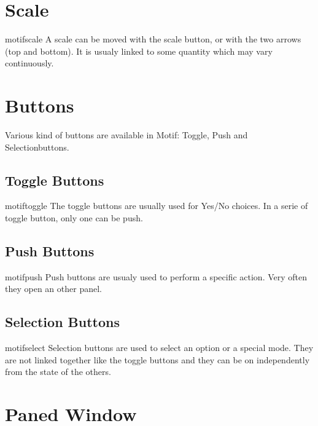 \section{Scale}


\begin{PAWf}[.05]{motifscale}
A scale can be moved with the scale button, or with
the two arrows (top and bottom). It is usualy linked
to some quantity which may vary continuously. 
\end{PAWf}


\section{Buttons}
Various kind of buttons are available in Motif: Toggle, Push and
Selectionbuttons.

\subsection{Toggle Buttons}

\begin{PAWf}[.2]{motiftoggle}
The toggle buttons are usually used for Yes/No choices.
In a serie of toggle button, only one can be push.
\end{PAWf}


\subsection{Push Buttons}

\begin{PAWf}[.2]{motifpush}
Push buttons are usualy used to perform a specific action. Very often
they open an other panel.
\end{PAWf}

\subsection{Selection Buttons}

\begin{PAWf}[.2]{motifselect}
Selection buttons are used to select an option or a special mode. They
are not linked together like the toggle buttons and they can be on
independently from the state of the others.
\end{PAWf}


\section{Paned Window}

